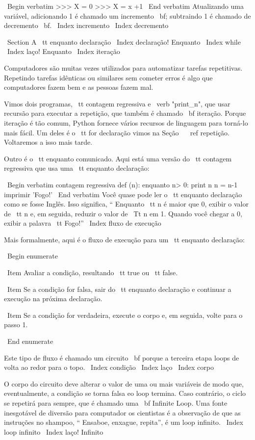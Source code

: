 \documentclass[10pt]{book}
\begin{document}
{{{{\ Begin {verbatim}
>>> X = 0
>>> X = x +1
\ End {verbatim}
%
Atualizando uma variável, adicionando 1 é chamado um incremento {\ bf};
subtraindo 1 é chamado de decremento {\ bf}.
\ Index {incremento}
\ Index {} decremento




\ Section {A {\ tt enquanto} declaração}
\ Index {declaração! Enquanto}
\ Index {while}
\ Index {laço! Enquanto}
\ Index {iteração}

Computadores são muitas vezes utilizados para automatizar tarefas repetitivas. Repetindo
tarefas idênticas ou similares sem cometer erros é algo que
computadores fazem bem e as pessoas fazem mal.

Vimos dois programas, {\ tt contagem regressiva} e \ verb "print_n", que
usar recursão para executar a repetição, que também é chamado {\ bf
iteração}. Porque iteração é tão comum, Python fornece vários
recursos de linguagem para torná-lo mais fácil. Um deles é o {\ tt for} declaração
vimos na Seção ~ \ ref {} repetição. Voltaremos a isso mais tarde.

Outro é o {\ tt enquanto} comunicado. Aqui está uma versão do {\ tt
contagem regressiva} que usa uma {\ tt enquanto} declaração:

\ Begin {verbatim}
contagem regressiva def (n):
    enquanto n> 0:
        print n
        n = n-1
    imprimir 'Fogo!'
\ End {verbatim}
%
Você quase pode ler o {\ tt enquanto} declaração como se fosse Inglês.
Isso significa, `` Enquanto {\ tt n} é maior que 0,
exibir o valor de {\ tt n} e, em seguida, reduzir o valor de
{\ Tt n} em 1. Quando você chegar a 0, exibir a palavra {\ tt Fogo!}''
\ Index {fluxo de execução}

Mais formalmente, aqui é o fluxo de execução para um {\ tt enquanto} declaração:

\ Begin {enumerate}

\ Item Avaliar a condição, resultando {\ tt true} ou {\ tt false}.

\ Item Se a condição for falsa, sair do {\ tt enquanto} declaração
e continuar a execução na próxima declaração.

\ Item Se a condição for verdadeira, execute o
corpo e, em seguida, volte para o passo 1.

\ End {enumerate}

Este tipo de fluxo é chamado um circuito {\ bf} porque a terceira etapa
loops de volta ao redor para o topo.  
\ Index {condição}
\ Index {laço}
\ Index {corpo}

O corpo do circuito deve alterar o valor de uma ou mais variáveis
de modo que, eventualmente, a condição se torna falsa eo loop
termina. Caso contrário, o ciclo se repetirá para sempre, que é chamado
uma {\ bf Infinite Loop}. Uma fonte inesgotável de diversão para computador
os cientistas é a observação de que as instruções no shampoo,
`` Ensaboe, enxague, repita'', é um loop infinito.
\ Index {loop infinito}
\ Index {laço! Infinito}

}}}}
\end{document}
